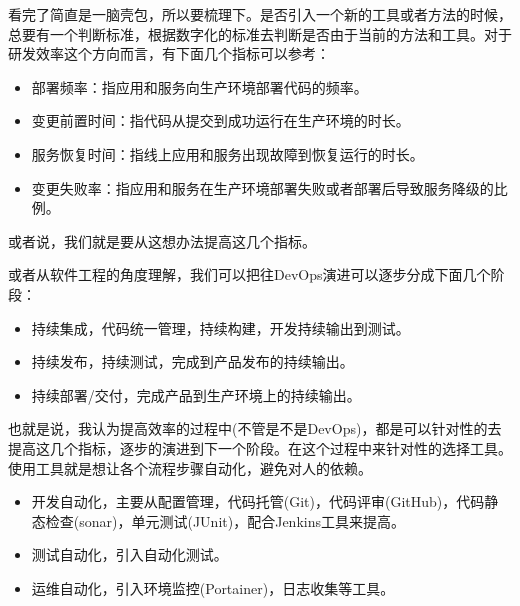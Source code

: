 \documentclass[12pt]{article}
\begin{document}
看完了简直是一脑壳包，所以要梳理下。是否引入一个新的工具或者方法的时候，总要有一个判断标准，根据数字化的标准去判断是否由于当前的方法和工具。对于研发效率这个方向而言，有下面几个指标可以参考：
\begin{itemize}
\setlength{\itemsep}{0pt}
\setlength{\parsep}{0pt}
\setlength{\parskip}{0pt}
    \item 部署频率：指应用和服务向生产环境部署代码的频率。

    \item 变更前置时间：指代码从提交到成功运行在生产环境的时长。
    
    \item 服务恢复时间：指线上应用和服务出现故障到恢复运行的时长。

    \item 变更失败率：指应用和服务在生产环境部署失败或者部署后导致服务降级的比例。
\end{itemize}

或者说，我们就是要从这想办法提高这几个指标。

或者从软件工程的角度理解，我们可以把往DevOps演进可以逐步分成下面几个阶段：

\begin{itemize}
\setlength{\itemsep}{0pt}
\setlength{\parsep}{0pt}
\setlength{\parskip}{0pt}
    \item 持续集成，代码统一管理，持续构建，开发持续输出到测试。

    \item 持续发布，持续测试，完成到产品发布的持续输出。
    
    \item 持续部署/交付，完成产品到生产环境上的持续输出。
\end{itemize}

也就是说，我认为提高效率的过程中(不管是不是DevOps)，都是可以针对性的去提高这几个指标，逐步的演进到下一个阶段。在这个过程中来针对性的选择工具。使用工具就是想让各个流程步骤自动化，避免对人的依赖。

\begin{itemize}
\setlength{\itemsep}{0pt}
\setlength{\parsep}{0pt}
\setlength{\parskip}{0pt}
    \item 开发自动化，主要从配置管理，代码托管(Git)，代码评审(GitHub)，代码静态检查(sonar)，单元测试(JUnit)，配合Jenkins工具来提高。

    \item 测试自动化，引入自动化测试。
    
    \item 运维自动化，引入环境监控(Portainer)，日志收集等工具。
\end{itemize}
\end{document}
